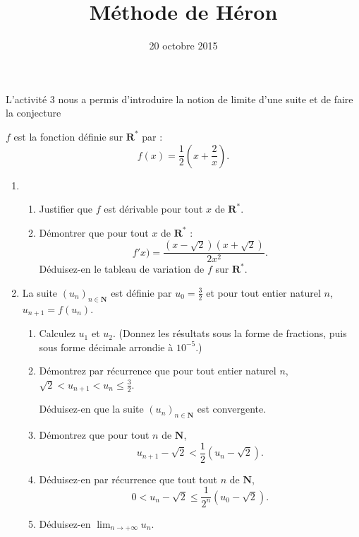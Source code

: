 \documentclass[a4paper,12pt,french]{article}
\title{Méthode de Héron}
\date{20 octobre 2015}
\newcommand{\N}{\mathbf{N}}
\newcommand{\R}{\mathbf{R}}
\begin{document}
\maketitle

\begin{Exercise}[number=104]
  L'activité 3 nous a permis d'introduire la notion de limite d'une
  suite et de faire la conjecture

  $f$ est la fonction définie sur $\R^*$ par : \[ f(x) = \frac12\left(x
  + \frac2x\right).\]

  \begin{enumerate}
    \item \begin{enumerate}
        \item Justifier que $f$ est dérivable pour tout $x$ de $\R^*$.
        \item Démontrer que pour tout $x$ de $\R^*$ : \[ f'x) = \frac{
          (x - \sqrt{2})(x + \sqrt{2})}{2x^2}.\] Déduisez-en le tableau
          de variation de $f$ sur $\R^*$.
      \end{enumerate}
    \item La suite $(u_n)_{n\in\N}$ est définie par $u_0 = \frac32$ et
      pour tout entier naturel $n$, $u_{n+1} = f(u_n)$.
      \begin{enumerate}
        \item Calculez $u_1$ et $u_2$. (Donnez les résultats sous la
          forme de fractions, puis sous forme décimale arrondie à
          $10^{-5}$.)
        \item Démontrez par récurrence que pour tout entier naturel $n$,
          $\sqrt{2} < u_{n+1} < u_n \leqslant \frac32$.

          Déduisez-en que la suite $(u_n)_{n\in\N}$ est convergente.
        \item Démontrez que pour tout $n$ de $\N$, \[ u_{n+1} - \sqrt{2}
          < \frac12\left(u_n - \sqrt{2} \right).\]
        \item Déduisez-en par récurrence que tout tout $n$ de $\N$, \[ 0
            < u_n - \sqrt{2} \leqslant \frac1{2^n}\left(u_0 - \sqrt{2}
          \right). \]
        \item Déduisez-en $\lim_{n\to+\infty}u_n$.
      \end{enumerate}
  \end{enumerate}
\end{Exercise}
\end{document}
